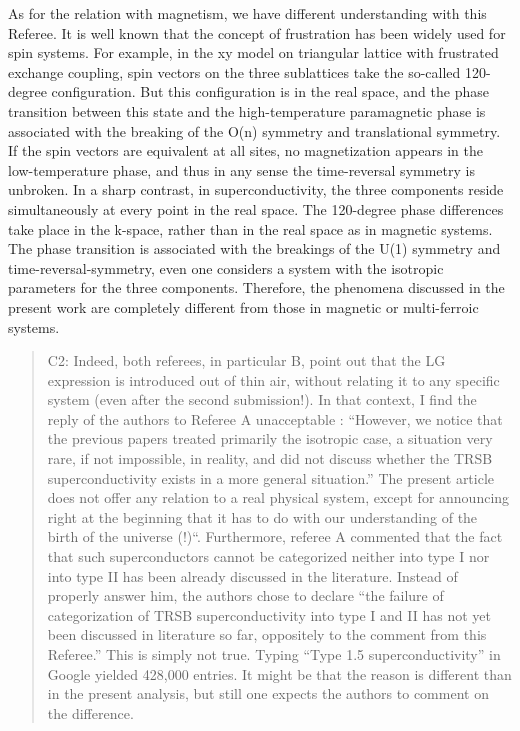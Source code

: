\documentclass[11pt]{article}
\begin{document}
As for the relation with magnetism, we have different understanding with
this Referee. It is well known that the concept of frustration has been
widely used for spin systems. For example, in the xy model on triangular
lattice with frustrated exchange coupling, spin vectors on the three
sublattices take the so-called 120-degree configuration. But this
configuration is in the real space, and the phase transition between
this state and the high-temperature paramagnetic phase is associated
with the breaking of the O(n) symmetry and translational symmetry. If
the spin vectors are equivalent at all sites, no magnetization appears
in the low-temperature phase, and thus in any sense the time-reversal
symmetry is unbroken. In a sharp contrast, in superconductivity, the
three components reside simultaneously at every point in the real space.
The 120-degree phase differences take place in the k-space, rather than
in the real space as in magnetic systems. The phase transition is
associated with the breakings of the U(1) symmetry and
time-reversal-symmetry, even one considers a system with the isotropic
parameters for the three components. Therefore, the phenomena discussed
in the present work are completely different from those in magnetic or
multi-ferroic systems.

\begin{quote}
C2: Indeed, both referees, in particular B, point out that the LG
expression is introduced out of thin air, without relating it to any
specific system (even after the second submission!). In that context, I
find the reply of the authors to Referee A unacceptable : ``However, we
notice that the previous papers treated primarily the isotropic case, a
situation very rare, if not impossible, in reality, and did not discuss
whether the TRSB superconductivity exists in a more general situation.''
The present article does not offer any relation to a real physical
system, except for announcing right at the beginning that it has to do
with our understanding of the birth of the universe (!)``. Furthermore,
referee A commented that the fact that such superconductors cannot be
categorized neither into type I nor into type II has been already
discussed in the literature. Instead of properly answer him, the authors
chose to declare ``the failure of categorization of TRSB
superconductivity into type I and II has not yet been discussed in
literature so far, oppositely to the comment from this Referee.'' This
is simply not true. Typing ``Type 1.5 superconductivity'' in Google
yielded 428,000 entries. It might be that the reason is different than
in the present analysis, but still one expects the authors to comment on
the difference.
\end{quote}
\end{document}
